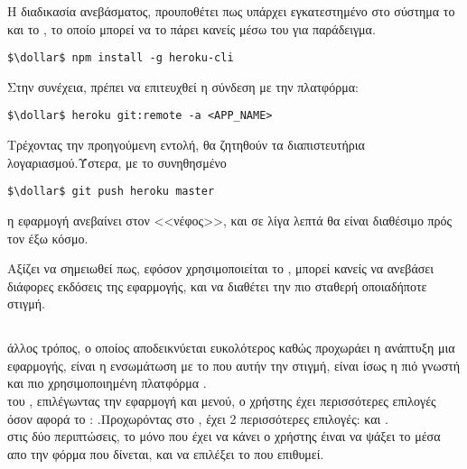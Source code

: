 Η διαδικασία ανεβάσματος, προυποθέτει πως υπάρχει εγκατεστημένο στο σύστημα το  και το , το οποίο μπορεί να το πάρει κανείς μέσω του  για παράδειγμα.
    \begin{lstlisting}[language=command.com]
    $\dollar$ npm install -g heroku-cli
    \end{lstlisting}
\quad Στην συνέχεια, πρέπει να επιτευχθεί η σύνδεση  με την πλατφόρμα:
    \begin{lstlisting}[language=command.com]
    $\dollar$ heroku git:remote -a <APP_NAME>
    \end{lstlisting}
\quad Τρέχοντας την προηγούμενη εντολή, θα ζητηθούν τα διαπιστευτήρια λογαριασμού.Ύστερα, με το συνηθησμένο 
    \begin{lstlisting}[language=command.com]
    $\dollar$ git push heroku master
    \end{lstlisting}
 η εφαρμογή ανεβαίνει στον <<νέφος>>, και σε λίγα λεπτά θα είναι διαθέσιμο πρός τον έξω κόσμο.

Αξίζει να σημειωθεί πως, εφόσον χρησιμοποιείται το , μπορεί κανείς να ανεβάσει διάφορες εκδόσεις της εφαρμογής, και να διαθέτει την πιο σταθερή οποιαδήποτε στιγμή.

\subsection*{}
 άλλος τρόπος, ο οποίος αποδεικνύεται ευκολότερος καθώς προχωράει η ανάπτυξη μια εφαρμογής, είναι η ενσωμάτωση με το  που αυτήν την στιγμή, είναι ίσως η πιό γνωστή και πιο χρησιμοποιημένη πλατφόρμα .\\
 του , επιλέγωντας την εφαρμογή και  μενού, ο χρήστης έχει περισσότερες επιλογές όσον αφορά το : .Προχωρόντας στο , έχει 2 περισσότερες επιλογές:  και .\\
 στις δύο περιπτώσεις, το μόνο που έχει να κάνει ο χρήστης έιναι να ψάξει το  μέσα απο την φόρμα που δίνεται, και να επιλέξει το  που επιθυμεί.